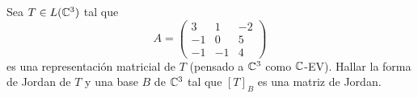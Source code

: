 \item Sea $T\in L(\mathbb{C}^3)$ tal que \[A=\begin{pmatrix}
        3&1&-2\\-1&0&5\\-1&-1&4
    \end{pmatrix}\]
    es una representación matricial de $T$ (pensado a $\mathbb{C}^3$ como $\mathbb{C}$-EV). Hallar la forma de Jordan de $T$ y una base $B$ de $\mathbb{C}^3$ tal que $[T]_B$ es una matriz de Jordan.
    \begin{mdframed}[style=s]
        
    \end{mdframed}